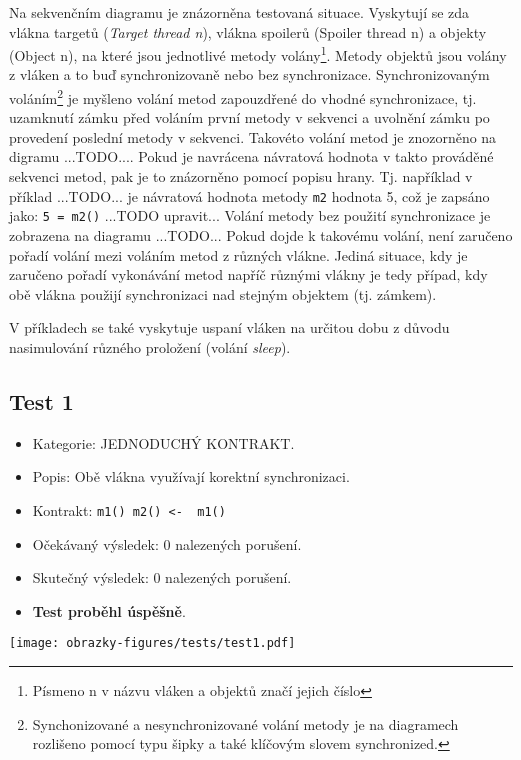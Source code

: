 Na sekvenčním diagramu je znázorněna testovaná situace. Vyskytují se zda vlákna targetů (\textit{Target thread n}), vlákna spoilerů (Spoiler thread n) a objekty (Object n), na které jsou jednotlivé metody volány\footnote{Písmeno n v názvu vláken a objektů značí jejich číslo}. Metody objektů jsou volány z vláken a to buď synchronizovaně nebo bez synchronizace. Synchronizovaným voláním\footnote{Synchonizované a nesynchronizované volání metody je na diagramech rozlišeno pomocí typu šipky a také klíčovým slovem synchronized.} je myšleno volání metod zapouzdřené do vhodné synchronizace, tj. uzamknutí zámku před voláním první metody v sekvenci a uvolnění zámku po provedení poslední metody v sekvenci. Takovéto volání metod je znozorněno na digramu ...TODO.... Pokud je navrácena návratová hodnota v takto prováděné sekvenci metod, pak je to znázorněno pomocí popisu hrany. Tj. například v příklad ...TODO... je návratová hodnota metody \texttt{m2} hodnota 5, což je zapsáno jako: \texttt{5 = m2()} ...TODO upravit...
Volání metody bez použití synchronizace je zobrazena na diagramu ...TODO... Pokud dojde k takovému volání, není zaručeno pořadí volání mezi voláním metod z různých vlákne. Jediná situace, kdy je zaručeno pořadí vykonávání metod napříč různými vlákny je tedy případ, kdy obě vlákna použijí synchronizaci nad stejným objektem (tj. zámkem).

V příkladech se také vyskytuje uspaní vláken na určitou dobu z důvodu nasimulování různého proložení (volání \textit{sleep}).



\subsection*{Test 1}

\begin{itemize}
\item Kategorie: JEDNODUCHÝ KONTRAKT.
\item Popis: Obě vlákna využívají korektní synchronizaci.
\item Kontrakt: \texttt{m1() m2() <- { m1() }}
\item Očekávaný výsledek: 0 nalezených porušení.
\item Skutečný výsledek: 0 nalezených porušení.
\item \textbf{Test proběhl úspěšně}.
\end{itemize}

\begin{center}
    \centering
    \texttt{[image: obrazky-figures/tests/test1.pdf]}
    \label{test1}
\end{center}

